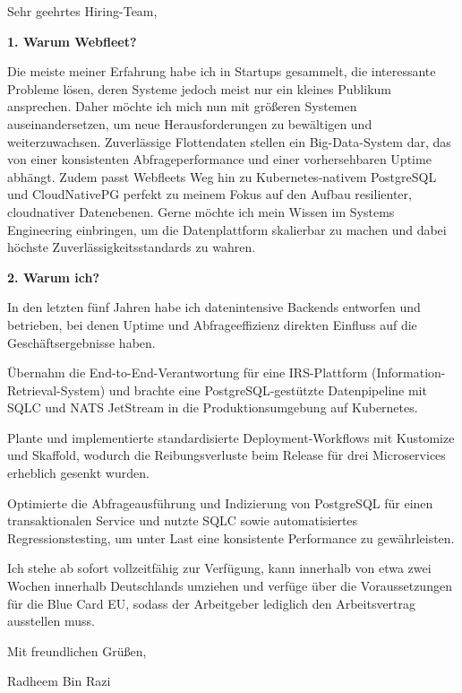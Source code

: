 \documentclass[11pt,a4paper]{coverletter}
\begin{document}
\clearpage
{}


\opening{Sehr geehrtes Hiring-Team,}

\vspace{8pt}\noindent\textbf{1. Warum Webfleet?}\par\vspace{3pt}

Die meiste meiner Erfahrung habe ich in Startups gesammelt, die interessante Probleme lösen, deren Systeme jedoch meist nur ein kleines Publikum ansprechen. Daher möchte ich mich nun mit größeren Systemen auseinandersetzen, um neue Herausforderungen zu bewältigen und weiterzuwachsen. Zuverlässige Flottendaten stellen ein Big-Data-System dar, das von einer konsistenten Abfrageperformance und einer vorhersehbaren Uptime abhängt. Zudem passt Webfleets Weg hin zu Kubernetes-nativem PostgreSQL und CloudNativePG perfekt zu meinem Fokus auf den Aufbau resilienter, cloudnativer Datenebenen. Gerne möchte ich mein Wissen im Systems Engineering einbringen, um die Datenplattform skalierbar zu machen und dabei höchste Zuverlässigkeitsstandards zu wahren.

\vspace{8pt}\noindent\textbf{2. Warum ich?}\par\vspace{3pt}

In den letzten fünf Jahren habe ich datenintensive Backends entworfen und betrieben, bei denen Uptime und Abfrageeffizienz direkten Einfluss auf die Geschäftsergebnisse haben.

\bullets

  \item Übernahm die End-to-End-Verantwortung für eine IRS-Plattform (Information-Retrieval-System) und brachte eine PostgreSQL-gestützte Datenpipeline mit SQLC und NATS JetStream in die Produktionsumgebung auf Kubernetes.

  \item Plante und implementierte standardisierte Deployment-Workflows mit Kustomize und Skaffold, wodurch die Reibungsverluste beim Release für drei Microservices erheblich gesenkt wurden.

  \item Optimierte die Abfrageausführung und Indizierung von PostgreSQL für einen transaktionalen Service und nutzte SQLC sowie automatisiertes Regressionstesting, um unter Last eine konsistente Performance zu gewährleisten.

\bulletsend

Ich stehe ab sofort vollzeitfähig zur Verfügung, kann innerhalb von etwa zwei Wochen innerhalb Deutschlands umziehen und verfüge über die Voraussetzungen für die Blue Card EU, sodass der Arbeitgeber lediglich den Arbeitsvertrag ausstellen muss.

\closing{Mit freundlichen Grüßen,}{Radheem Bin Razi}
\end{document}
